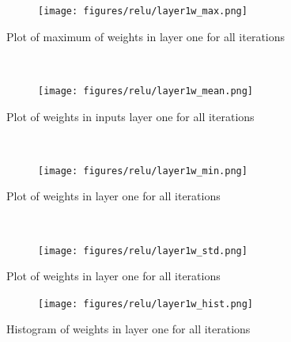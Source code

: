 \documentclass[]{article}
\begin{document}
\begin{figure}[ht]
    \centering
    \begin{subfigure}
        \centering
        \texttt{[image: figures/relu/layer1w\_max.png]}
    \end{subfigure}%
    \caption{Plot of maximum of weights in layer one for all iterations}
 \label{fig:/layer1w_max}
    ~ 
    \centering
    \begin{subfigure}
        \centering
        \texttt{[image: figures/relu/layer1w\_mean.png]}
    \end{subfigure}%
    \caption{Plot of weights in inputs layer one for all iterations}
 \label{fig:/layer1w_mean}
    ~ 
    \centering
    \begin{subfigure}
        \centering
        \texttt{[image: figures/relu/layer1w\_min.png]}
    \end{subfigure}%
    \caption{Plot of weights in layer one for all iterations}
 \label{fig:/layer1w_min}
    ~ 
    \centering
    \begin{subfigure}
        \centering
        \texttt{[image: figures/relu/layer1w\_std.png]}
    \end{subfigure}%
    \caption{Plot of weights in layer one for all iterations}
 \label{fig:/layer1w_std}
\end{figure}

\begin{figure}
    \centering
    \begin{subfigure}
        \centering
        \texttt{[image: figures/relu/layer1w\_hist.png]}
    \end{subfigure}%
    \caption{Histogram of weights in layer one for all iterations}
 \label{fig:/layer1w_hist}
\end{figure}

\clearpage
\end{document}
